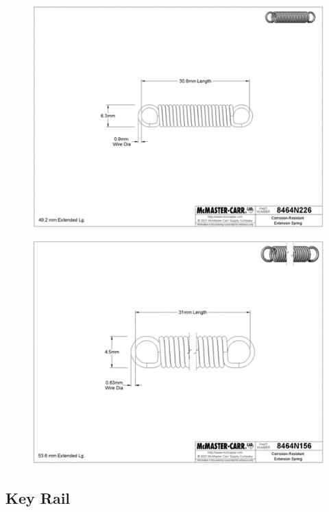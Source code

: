 \newpage
\begin{figure}[h!]
  \centering
  \includegraphics[width=\linewidth]{image/Spring2.png}
  \caption{}
  \label{fig:spring2}
\end{figure}

\newpage
\begin{figure}[h!]
  \centering
  \includegraphics[width=\linewidth]{image/Spring3.png}
  \caption{}
  \label{fig:spring3}
\end{figure}
\newpage

\subsection{Key Rail}

